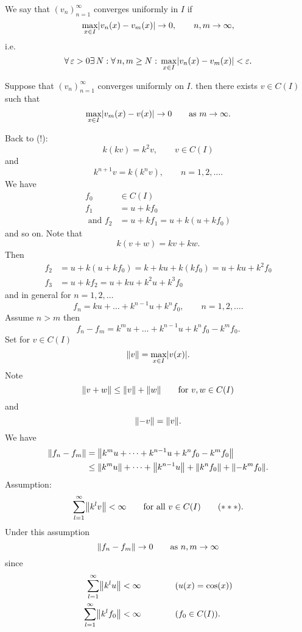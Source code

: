 \begin{enumerate}[1.]
\begin{definition*}
\[		\]
		We say that $(v_n)_{n=1}^{\infty}$ converges uniformly in $I$ if
		\[
			\max_{x \in I} \lvert v_n(x)-v_m(x)\rvert \to 0 , \qquad n,m \to \infty,
		\]
		i.e.
		\[
			\forall\, \varepsilon >0 \exists\, N: \forall\, n,m \geq N: \, \max_{x \in I}\lvert v_n(x)-v_m(x)\rvert< \varepsilon.
		\]
	\end{definition*}
	\begin{lemma*}
		Suppose that $(v_n)_{n=1}^{\infty}$ converges uniformly on $I$. then there exists $v \in C(I)$ such that
		\[
			 \max_{x \in I}\lvert v_m(x)-v(x)\rvert \to 0 \qquad \text{as }m \to \infty.
		\]
	\end{lemma*}
	Back to (!): \\
	\[
		k(kv) = k^2 v, \qquad v \in C(I)
	\]
	and
	\[
		k^{n+1}v = k(k^nv), \qquad n=1,2,\dots.
	\]
	We have 
	\begin{align*}
		f_0 & \in C(I) \\ f_1 &=u+kf_0 \\ \text{ and }  
				f_2 &= u + kf_1 = u + k(u+kf_0)
	\end{align*}
	and so on. Note that
	\[
		k(v+w)=kv+kw.
	\]
	Then 
	\begin{align*}
		f_2 &= u +k (u+kf_0) = k + ku + k(kf_0) = u + ku +k^2f_0 \\
		f_3 &= u + kf_2 = u + ku + k^2u + k^3f_0
	\end{align*}
	and in general for $n=1,2,\dots$
	\[
		f_n = ku + \dots + k^{n-1}u + k^n f_0, \qquad n=1,2,\dots.
	\]
	Assume $n>m$ then
	\[
		f_n-f_m = k^mu + \dots + k^{n-1}u + k^nf_0 - k^mf_0.
	\]
	Set for $v \in C(I)$
	\[
		\norm{v} = \max_{x \in I}\abs{v(x)}.
	\]
	Note
	\[
		\norm{v+w} \leq \norm{v} + \norm{w} \qquad \text{for }v,w \in C(I)
	\]
	and
	\[
		\norm{-v}=\norm{v}.
	\]
	We have
	\begin{align*}
		\norm{f_n-f_m} &= \norm{k^mu + \dots + k^{n-1}u + k^nf_0 - k^m f_0} \\
		&\leq \norm{k^mu} + \dots + \norm{ k^{n-1}u} + \norm{k^nf_0} + \norm{- k^mf_0}.
	\end{align*}
	Assumption:
	\[
		\sum_{l=1}^{\infty} \norm{k^lv} < \infty \qquad \text{for all }v \in C(I) \qquad (***).
	\]
	Under this assumption
	\[
		\norm{f_n-f_m} \to 0 \qquad \text{as }n,m \to \infty
	\]
	since
	\begin{align*}
		\sum_{l=1}^{\infty}\norm{k^lu} &< \infty \qquad \qquad (u(x)=\cos(x)) \\
		\sum_{l=1}^{\infty}\norm{k^lf_0} &< \infty \qquad \qquad (f_0 \in C(I)).
	\end{align*}

\end{enumerate}
